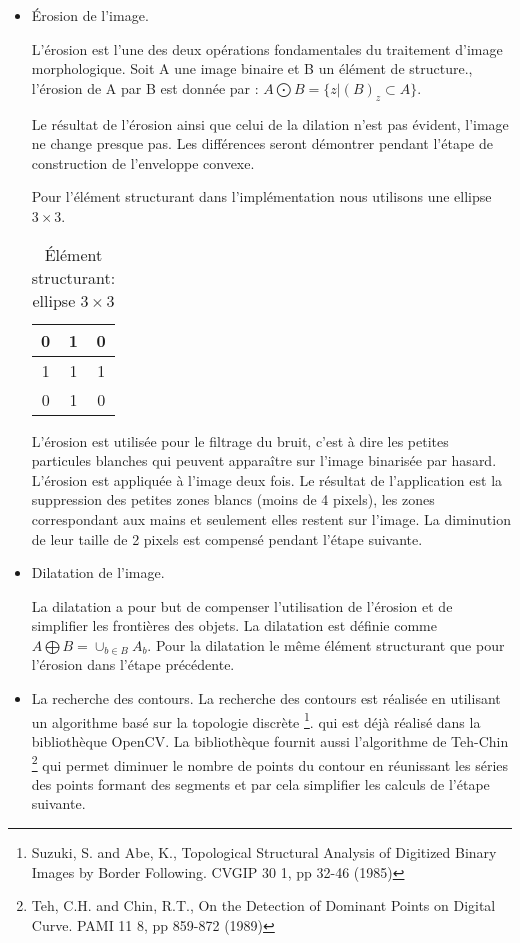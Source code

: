 \begin{itemize}
    \item Érosion de l'image.
	    \par L'érosion est l'une des deux opérations fondamentales du traitement d'image morphologique. Soit A une image binaire et B un élément de structure., l'érosion de A par B est donnée par : $A \bigodot B = \{z|(B)_z \subset A\}$.
    	\par Le résultat de l'érosion ainsi que celui de la dilation n'est pas évident, l'image ne change presque pas. Les différences seront démontrer pendant l'étape de construction de l'enveloppe convexe. 
	    \par Pour l'élément structurant dans l'implémentation nous utilisons une ellipse $3 \times 3$.
	    \begin{table}[h!]
    	    \centering
    	    \begin{tabular}{|c|c|c|}
        	    \hline
        	    0 & 1 & 0 \\ \hline
        	    1 & 1 & 1 \\ \hline
        	    0 & 1 & 0 \\ \hline
        	\end{tabular}
        	\caption{Élément structurant: ellipse $3 \times 3$}
    	\end{table}
    	\par L'érosion est utilisée pour le filtrage du bruit, c'est à dire les  petites particules blanches qui peuvent apparaître sur l'image binarisée par hasard. L'érosion est appliquée à l'image deux fois. Le résultat de l'application est la suppression des petites zones blancs (moins de 4 pixels), les zones correspondant aux mains et seulement elles restent sur l'image. La diminution de leur taille de 2 pixels est compensé pendant l'étape suivante.

    \item Dilatation de l'image.
    	\par La dilatation a pour but de compenser l'utilisation de l'érosion et de  simplifier les frontières des objets. La dilatation est définie comme $A  \bigoplus B = \cup_{b \in B}A_b$. Pour la dilatation le même élément structurant que pour l'érosion dans l'étape précédente. 

    \item La recherche des contours. La recherche des contours est réalisée en utilisant un algorithme basé sur la topologie discrète \footnote{Suzuki, S. and Abe, K., Topological Structural Analysis of Digitized Binary Images by Border Following. CVGIP 30 1, pp 32-46 (1985)}. qui est déjà réalisé dans la bibliothèque OpenCV. La bibliothèque fournit aussi l'algorithme de Teh-Chin \footnote{Teh, C.H. and Chin, R.T.,  On the Detection of Dominant Points on Digital Curve. PAMI 11 8, pp  859-872 (1989)} qui permet diminuer le nombre de points du contour en réunissant les séries des points formant des segments et par cela simplifier les calculs de l'étape suivante.


\end{itemize}
